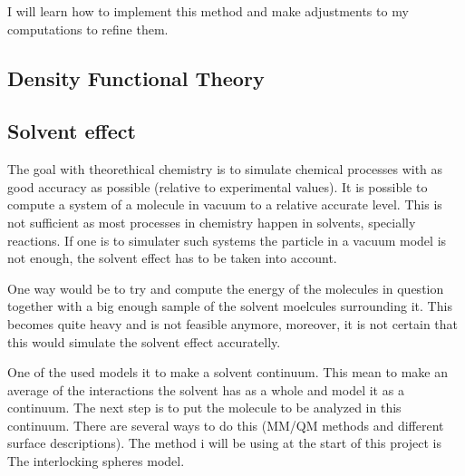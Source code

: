 \documentclass[a4paper,11pt]{article}
\begin{document}
I will learn how to implement this method and make adjustments to my computations to refine them.

\subsection{Density Functional Theory}

\subsection{Solvent effect}

The goal with theorethical chemistry is to simulate chemical processes with as good accuracy as possible (relative to experimental values). It is possible to compute a system of a molecule in vacuum to a relative accurate level. This is not sufficient as most processes in chemistry happen in solvents, specially reactions. If one is to simulater such systems the particle in a vacuum model is not enough, the solvent effect has to be taken into account.

One way would be to try and compute the energy of the molecules in question together with a big enough sample of the solvent moelcules surrounding it. This becomes quite heavy and is not feasible anymore, moreover, it is not certain that this would simulate the solvent effect accuratelly.

One of the used models it to make a solvent continuum. This mean to make an average of the interactions the solvent has as a whole and model it as a continuum. The next step is to put the molecule to be analyzed in this continuum. There are several ways to do this (MM/QM methods and different surface descriptions). The method i will be using at the start of this project is The interlocking spheres model.
\end{document}
